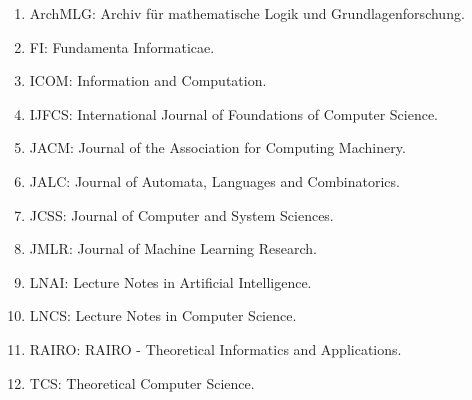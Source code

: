 

\begin{enumerate}[]
\item {\sf ArchMLG}: Archiv für mathematische Logik und Grundlagenforschung.
\item {\sf FI}: Fundamenta Informaticae.
\item {\sf ICOM}: Information and Computation.
\item {\sf IJFCS}: International Journal of Foundations of Computer Science.
\item {\sf JACM}: Journal of the Association for Computing Machinery.
\item {\sf JALC}: Journal of Automata, Languages and Combinatorics.
\item {\sf JCSS}: Journal of Computer and System Sciences.
\item {\sf JMLR}: Journal of Machine Learning Research.
\item {\sf LNAI}: Lecture Notes in Artificial Intelligence.
\item {\sf LNCS}: Lecture Notes in Computer Science.
\item {\sf RAIRO}: RAIRO - Theoretical Informatics and Applications.
\item {\sf TCS}: Theoretical Computer Science.
\end{enumerate}
